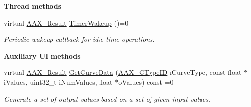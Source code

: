 \begin{Indent}\textbf{ Thread methods}\par
\begin{DoxyCompactItemize}
\item 
virtual \mbox{\hyperlink{a00392_a4d8f69a697df7f70c3a8e9b8ee130d2f}{A\+A\+X\+\_\+\+Result}} \mbox{\hyperlink{a01669_ab5b8da9e1a9d778d327ac04f4ab8d139}{Timer\+Wakeup}} ()=0
\begin{DoxyCompactList}\small\item\em Periodic wakeup callback for idle-\/time operations. \end{DoxyCompactList}\end{DoxyCompactItemize}
\end{Indent}
\begin{Indent}\textbf{ Auxiliary UI methods}\par
\begin{DoxyCompactItemize}
\item 
virtual \mbox{\hyperlink{a00392_a4d8f69a697df7f70c3a8e9b8ee130d2f}{A\+A\+X\+\_\+\+Result}} \mbox{\hyperlink{a00812_gaa85bda4027342eb644a9c92a17da6d49}{Get\+Curve\+Data}} (\mbox{\hyperlink{a00392_ac678f9c1fbcc26315d209f71a147a175}{A\+A\+X\+\_\+\+C\+Type\+ID}} i\+Curve\+Type, const float $\ast$i\+Values, uint32\+\_\+t i\+Num\+Values, float $\ast$o\+Values) const =0
\begin{DoxyCompactList}\small\item\em Generate a set of output values based on a set of given input values. \end{DoxyCompactList}\end{DoxyCompactItemize}
\end{Indent}
